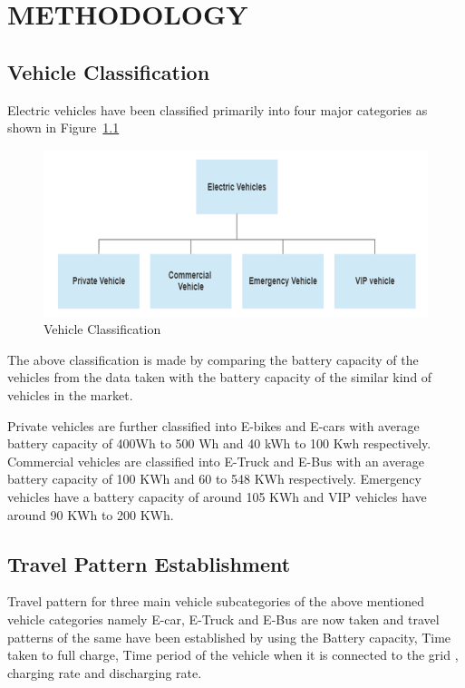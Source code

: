 	\chapter{METHODOLOGY}
	\label{chap:work}
	
	\section{Vehicle Classification}
	
	 Electric vehicles have been classified primarily into four major categories as shown in Figure~\ref{fig:classification} 
	 	
			\begin{figure}[h]
				\centering
				\includegraphics[width=0.7\linewidth]{classification}
				\caption{Vehicle Classification}
				\label{fig:classification}
			\end{figure}
		
	The above classification is made by comparing the battery capacity of the vehicles from the data \cite{evdata} taken with the battery capacity of the similar kind of vehicles in the market.

	\par {Private vehicles are further classified into E-bikes and E-cars with average battery capacity of 400Wh to 500 Wh and 40 kWh to 100 Kwh respectively. Commercial vehicles are classified into E-Truck and E-Bus with an average battery capacity of 100 KWh and 60 to 548 KWh respectively. Emergency vehicles have a battery capacity of around 105 KWh and VIP vehicles have around 90 KWh to 200 KWh.
	}
	
	\section{Travel Pattern Establishment}
	
	Travel pattern for three main vehicle subcategories of the above mentioned vehicle categories namely E-car, E-Truck and E-Bus are now taken and travel patterns of the same have been established by using the Battery capacity, Time taken to full charge, Time period of the vehicle when it is connected to the grid , charging rate and discharging rate.
	

